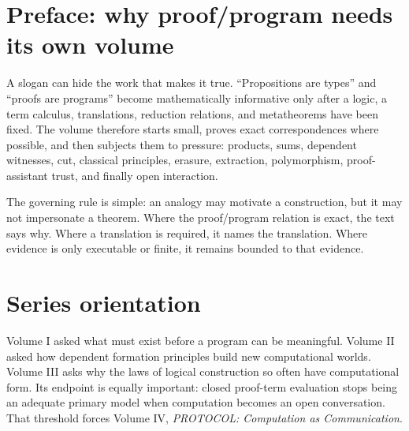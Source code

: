 \documentclass[11pt,openany]{book}
\begin{document}
\chapter*{Preface: why proof/program needs its own volume}
A slogan can hide the work that makes it true. ``Propositions are types'' and ``proofs are programs'' become mathematically informative only after a logic, a term calculus, translations, reduction relations, and metatheorems have been fixed. The volume therefore starts small, proves exact correspondences where possible, and then subjects them to pressure: products, sums, dependent witnesses, cut, classical principles, erasure, extraction, polymorphism, proof-assistant trust, and finally open interaction.

The governing rule is simple: an analogy may motivate a construction, but it may not impersonate a theorem. Where the proof/program relation is exact, the text says why. Where a translation is required, it names the translation. Where evidence is only executable or finite, it remains bounded to that evidence.

\chapter*{Series orientation}
Volume I asked what must exist before a program can be meaningful. Volume II asked how dependent formation principles build new computational worlds. Volume III asks why the laws of logical construction so often have computational form. Its endpoint is equally important: closed proof-term evaluation stops being an adequate primary model when computation becomes an open conversation. That threshold forces Volume IV, \emph{PROTOCOL: Computation as Communication}.

\tableofcontents
\mainmatter
{}
\end{document}
